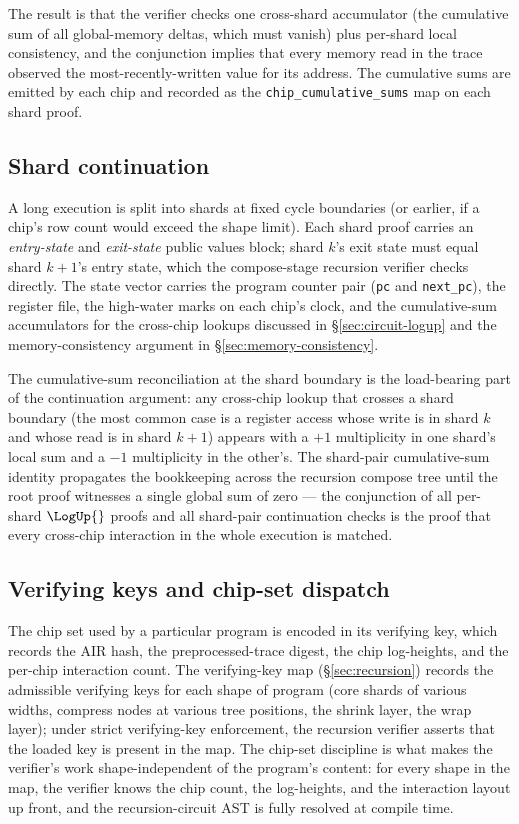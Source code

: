 The result is that the verifier checks one cross-shard accumulator (the cumulative sum of all global-memory deltas, which must vanish) plus per-shard local consistency, and the conjunction implies that every memory read in the trace observed the most-recently-written value for its address. The cumulative sums are emitted by each chip and recorded as the \texttt{chip\_cumulative\_sums} map on each shard proof.

\subsection{Shard continuation}
\label{sec:shard-continuation}

A long \zkVM{} execution is split into shards at fixed cycle boundaries (or earlier, if a chip's row count would exceed the shape limit). Each shard proof carries an \emph{entry-state} and \emph{exit-state} public values block; shard $k$'s exit state must equal shard $k+1$'s entry state, which the compose-stage recursion verifier checks directly. The state vector carries the program counter pair (\texttt{pc} and \texttt{next\_pc}), the register file, the high-water marks on each chip's clock, and the cumulative-sum accumulators for the cross-chip lookups discussed in \S\ref{sec:circuit-logup} and the memory-consistency argument in \S\ref{sec:memory-consistency}.

The cumulative-sum reconciliation at the shard boundary is the load-bearing part of the continuation argument: any cross-chip lookup that crosses a shard boundary (the most common case is a register access whose write is in shard $k$ and whose read is in shard $k+1$) appears with a $+1$ multiplicity in one shard's local sum and a $-1$ multiplicity in the other's. The shard-pair cumulative-sum identity propagates the bookkeeping across the recursion compose tree until the root proof witnesses a single global sum of zero — the conjunction of all per-shard $\LogUp{}$ proofs and all shard-pair continuation checks is the proof that every cross-chip interaction in the whole execution is matched.

\subsection{Verifying keys and chip-set dispatch}

The chip set used by a particular program is encoded in its verifying key, which records the AIR hash, the preprocessed-trace digest, the chip log-heights, and the per-chip interaction count. The verifying-key map (\S\ref{sec:recursion}) records the admissible verifying keys for each shape of program (core shards of various widths, compress nodes at various tree positions, the shrink layer, the wrap layer); under strict verifying-key enforcement, the recursion verifier asserts that the loaded key is present in the map. The chip-set discipline is what makes the verifier's work shape-independent of the program's content: for every shape in the map, the verifier knows the chip count, the log-heights, and the interaction layout up front, and the recursion-circuit AST is fully resolved at compile time.
